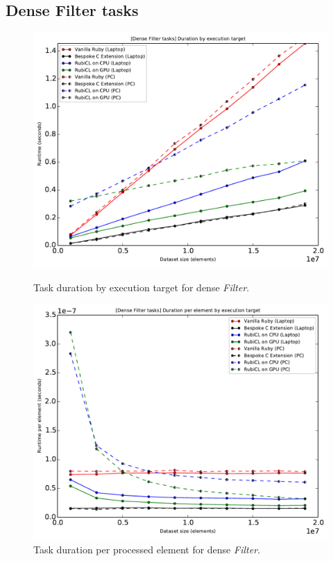 
\subsection{Dense Filter tasks}
\begin{figure}[H]
  \centering
  \includegraphics[width=\textwidth]{./graphing/dense_filter/runtimes.pdf}
  \caption{Task duration by execution target for dense \emph{Filter}.}
  \label{fig:dfilter_task_runtime_g}

  \includegraphics[width=\textwidth]{./graphing/dense_filter/per_element.pdf}
  \caption{Task duration per processed element for dense \emph{Filter}.}
  \label{fig:dfilter_task_per_el_g}

\end{figure}

